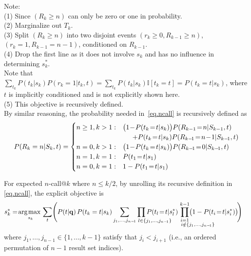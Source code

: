 \documentclass[a4paper]{article}
\newcommand{\I}{\mathbb{I}}
\renewcommand{\vec}[1]{\mathbf{#1}}
\def\argmax{\operatornamewithlimits{\!arg \;\! max\,}}
\begin{document}
\noindent
Note: \\
(1) Since $( R_k \geq n )$ can only be zero or one in probability. \\
(2) Marginalize out $T_k$. \\
(3) Split $( R_k \geq n )$ into two disjoint events $(r_k \! \geq \! 0, R_{k\!-\!1}\!\geq \!n)$, $(r_k\!=\!1, R_{k\!-\!1}\!=\!n\!-\!1)$, conditioned on $R_{k-1}$. \\
(4) Drop the first line as it does not involve $s_k$ and has no influence in determining $s_k^*$. \\
Note that $\sum_{t_k} \!\! P(t_k|s_k) P(r_k\!\!=\!\!1|t_k,t) = \sum_{t_k} \!\! P(t_k|s_k) \I[t_k\!=\!t] \! = \! P(t_k\!\!=\!\!t|s_k)$, where $t$ is implicitly conditioned and is not explicitly shown here. \\
(5) This objective is recursively defined. \\

By similar reasoning, the probability needed in~\eqref{eq.ncall} is recursively defined as
\begin{align*}
P(R_k=n|S_k,t)=
\begin{cases}
n \geq 1, k > 1:  &  \bigl( 1\!-\!P(t_k\!=\!t|s_k) \bigr) P(R_{k-1}\!=\!n|S_{k-1},t) \nonumber \\
  & \hspace{5mm} + P(t_k\!=\!t|s_k) P(R_{k-\!1}\!=\!n\!-\!1|S_{k-\!1},t) \\
n = 0, k > 1:   & \bigl( 1\!-\!P(t_k\!=\!t|s_k) \bigr) P(R_{k-\!1}\!=\!0|S_{k-\!1},t) \\
n = 1, k = 1:   & P(t_1\!=\!t|s_1) \\
n = 0, k = 1:   & 1 - P(t_1\!=\!t|s_1)
\end{cases}
\end{align*}

For expected $n$-call@$k$ where $n \! \leq \! k/2$, by unrolling its recursive definition in \eqref{eq.ncall}, the explicit objective is
\begin{align}
  & s_k^* = \argmax_{s_k} \sum_t \Biggl( P(t|\vec{q}) \, P(t_k=t|s_k) \sum_{j_1, \dots, j_{n-\!1}} \hspace{-14mm} \prod_{\hspace{14.5mm} l \in \{j_1, \dots, j_{n-\!1}\}} \hspace{-14mm} P(t_l\!=\!t|s_l^*) \hspace{-13mm} \prod_{\substack{i=1 \\ \hspace{14mm} i \notin \{j_1, \dots, j_{n-\!1}\}}}^{k-1} \hspace{-13mm} \!\bigl( 1 - P(t_i\!=\!t|s_i^*) \bigr) \!\Biggr) \label{eq.ncall.alt}
\end{align}
where $j_1, \dots, j_{n-1} \in \{1,\ldots,k-1\}$ satisfy 
that $j_i < j_{i+1}$ (i.e.,
an ordered permutation of $n-1$ result set indices). \\
\end{document}
